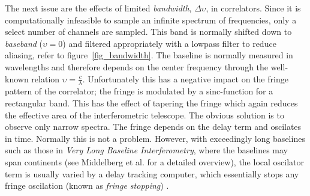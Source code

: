 \documentclass[a4paper,10pt]{report}
\begin{document}
The next issue are the effects of limited \textit{bandwidth}, $\Delta\upsilon$, in correlators. Since it is computationally infeasible to sample an infinite spectrum of frequencies, only a select number of channels are sampled. This
band is normally shifted down to \textit{baseband} ($\upsilon=0$) and filtered appropriately with a lowpass filter to reduce aliasing, refer to figure~\ref{fig_bandwidth}. The baseline is normally measured in wavelengths and therefore depends on the
center frequency through the well-known relation $\upsilon=\frac{c}{\lambda}$. Unfortunately this has a negative impact on the fringe pattern of the correlator; the fringe is modulated by a sinc-function for a rectangular band. This has
the effect of tapering the fringe which again reduces the effective area of the interferometric telescope. The obvious solution is to observe only narrow spectra. The fringe depends on the delay term and oscilates in time. Normally this is not a problem.
However, with exceedingly long baselines such as those in \textit{Very Long Baseline Interferometry}, where the baselines may span continents (see Middelberg et al. \cite{middelberg2008high} for a detailed overview), the local oscilator term is usually varied 
by a delay tracking computer, which essentially stops any fringe oscilation (known as \textit{fringe stopping}) \cite{taylor1999synthesis}.
\end{document}
